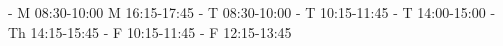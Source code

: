 \documentclass{article}
\begin{document}
\begin{timetable}
   {-}    {\zoom}  {M}
  {08:30-10:00} {\phigh}
               {\tbd} {\teams} {M}  {16:15-17:45} {\pmid}
   {-}    {\zoom}  {T}
  {08:30-10:00} {\phigh}
               {-}    {\teams} {T}  {10:15-11:45} {\pmid}
           {-}    {\teams} {T}
  {14:00-15:00} {\phigh}
               {-}    {\teams} {Th} {14:15-15:45} {\pmid}
                   {-}    {\teams} {F}  {10:15-11:45} {}
        {-}    {\zoom}  {F}
  {12:15-13:45} {\pmandatory}
\end{timetable}
\end{document}
